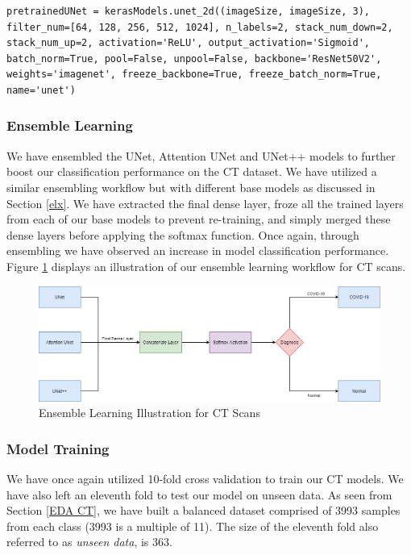\vspace{1em}
\begin{lstlisting}
pretrainedUNet = kerasModels.unet_2d((imageSize, imageSize, 3), filter_num=[64, 128, 256, 512, 1024], n_labels=2, stack_num_down=2, stack_num_up=2, activation='ReLU', output_activation='Sigmoid', batch_norm=True, pool=False, unpool=False, backbone='ResNet50V2', weights='imagenet', freeze_backbone=True, freeze_batch_norm=True, name='unet') 
\end{lstlisting}

\subsubsection{Ensemble Learning}

We have ensembled the UNet, Attention UNet and UNet++ models to further boost our classification performance on the CT dataset. We have utilized a similar ensembling workflow but with different base models as discussed in Section \ref{elx}. We have extracted the final dense layer, froze all the trained layers from each of our base models to prevent re-training, and simply merged these dense layers before applying the softmax function. Once again, through ensembling we have observed an increase in model classification performance. Figure \ref{fig:ct ensemble} displays an illustration of our ensemble learning workflow for CT scans.

\begin{figure}[H]
	\centering
	\includegraphics[width=15.5cm]{Images/EnsembleCT.png}
	\caption{\small Ensemble Learning Illustration for CT Scans}
	\label{fig:ct ensemble}
\end{figure}

\subsubsection{Model Training}

We have once again utilized 10-fold cross validation to train our CT models. We have also left an eleventh fold to test our model on unseen data. As seen from Section \ref{EDA CT}, we have built a balanced dataset comprised of 3993 samples from each class (3993 is a multiple of 11). The size of the eleventh fold also referred to as \textit{unseen data}, is 363.


